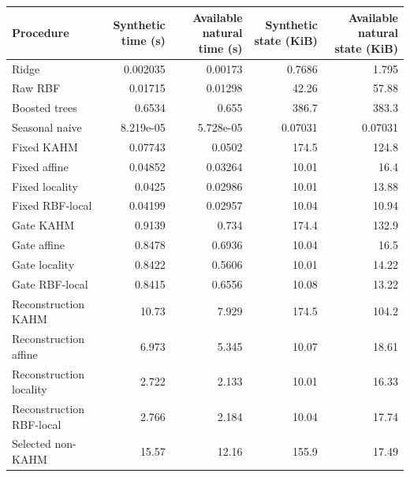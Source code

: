 \begin{tabular}{lrrrr}
\toprule
Procedure & Synthetic time (s) & Available natural time (s) & Synthetic state (KiB) & Available natural state (KiB) \\
\midrule
Ridge & 0.002035 & 0.00173 & 0.7686 & 1.795 \\
Raw RBF & 0.01715 & 0.01298 & 42.26 & 57.88 \\
Boosted trees & 0.6534 & 0.655 & 386.7 & 383.3 \\
Seasonal naive & 8.219e-05 & 5.728e-05 & 0.07031 & 0.07031 \\
Fixed KAHM & 0.07743 & 0.0502 & 174.5 & 124.8 \\
Fixed affine & 0.04852 & 0.03264 & 10.01 & 16.4 \\
Fixed locality & 0.0425 & 0.02986 & 10.01 & 13.88 \\
Fixed RBF-local & 0.04199 & 0.02957 & 10.04 & 10.94 \\
Gate KAHM & 0.9139 & 0.734 & 174.4 & 132.9 \\
Gate affine & 0.8478 & 0.6936 & 10.04 & 16.5 \\
Gate locality & 0.8422 & 0.5606 & 10.01 & 14.22 \\
Gate RBF-local & 0.8415 & 0.6556 & 10.08 & 13.22 \\
Reconstruction KAHM & 10.73 & 7.929 & 174.5 & 104.2 \\
Reconstruction affine & 6.973 & 5.345 & 10.07 & 18.61 \\
Reconstruction locality & 2.722 & 2.133 & 10.01 & 16.33 \\
Reconstruction RBF-local & 2.766 & 2.184 & 10.04 & 17.74 \\
Selected non-KAHM & 15.57 & 12.16 & 155.9 & 17.49 \\
\bottomrule
\end{tabular}
